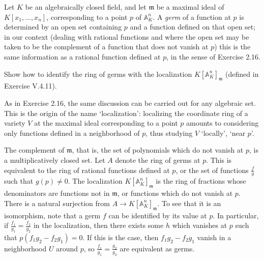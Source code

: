 \documentclass[../../master.tex]{subfiles}
\begin{document}
\begin{problem}
    Let $K$ be an algebraically closed field, and let $\mathfrak{m}$ be a maximal ideal of $K[x_1, \ldots, x_n]$, corresponding to a point $p$ of $\mathbb{A}^{n}_K$.
    A \textit{germ} of a function at $p$ is determined by an open set containing $p$ and a function defined on that open set;
    in our context (dealing with rational functions and where the open set may be taken to be the complement of a function that does not vanish at $p$) this is the same  information as a rational function defined at $p$, in the sense of Exercise 2.16.

    Show how to identify the ring of germs with the localization $K[\mathbb{A}^{n}_K]_\mathfrak{m}$ (defined in Exercise V.4.11).

    As in Exercise 2.16, the same discussion can be carried out for any algebraic set.
    This is the origin of the name `localization': localizing the coordinate ring of a variety $V$ at the maximal ideal corresponding to a point $p$ amounts to considering only functions defined in a neighborhood of $p$, thus studying $V$ `locally', `near $p$'.
\end{problem}

\begin{solution}
    The complement of $\mathfrak{m}$, that is, the set of polynomials which do not vanish at $p$, is a multiplicatively closed set.
    Let $A$ denote the ring of germs at $p$.
    This is equivalent to the ring of rational functions defined at $p$, or the set of functions $\frac{f}{g}$ such that $g(p) \neq 0$.
    The localization $K[\mathbb{A}^{n}_K]_\mathfrak{m}$ is the ring of fractions whose denominators are functions not in $\mathfrak{m}$, or functions which do not vanish at $p$.
    There is a natural surjection from $A \to K[\mathbb{A}^{n}_K]_\mathfrak{m}$.
    To see that it is an isomorphism, note that a germ $f$ can be identified by its value at $p$.
    In particular, if $\frac{f_1}{g_1} = \frac{f_2}{g_2}$ in the localization, then there exists some $h$ which vanishes at $p$ such that $p(f_1 g_2 - f_2 g_1) = 0$.
    If this is the case, then $f_1 g_2 - f_2 g_1$ vanish in a neighborhood $U$ around $p$, so $\frac{f_1}{g_1} = \frac{g_2}{g_2}$ are equivalent as germs.
\end{solution}
\end{document}
